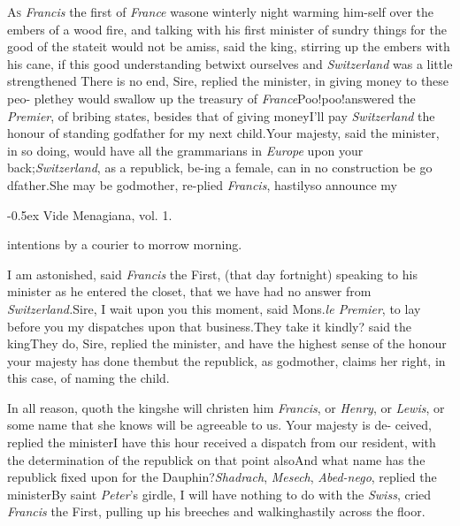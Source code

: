 \documentclass{article}
\begin{document}
\lettrine{A}{s} \textit{Francis} the first of
\textit{France} was\break one winterly night warming
him-\break self over the embers of a wood fire, and talking
with his first minister of sundry\pb 
things for the good of the state\tsk it\break
would not be amiss, said the king, stirring up the embers
with his cane, if this\break
good understanding betwixt ourselves\break
and \textit{Switzerland} was a little strengthened\break
\tsk There is no end, Sire, replied the mi\-nister, in giving
money to these peo-\break
ple\tsk they would swallow up the treasury
of \textit{France}\tsk Poo!\@ poo!\@  answered the \break
\textit{Premier}, of bribing
states, besides that\break
of giving money\tsh I’ll pay
\textit{Switzerland} the honour of standing godfather\break
for my next child.\tsk Your majesty, said the minister, in
so doing, would have all the grammarians in \textit{Europe}
upon your back;\tsk \textit{Switzerland}, as a republick,
be-\break ing a female, can in no construction be go
dfather.\tsk She
may be godmother, re-\break plied \textit{Francis}, hastily\tsk so
announce my\break\enlargethispage{\baselineskip}

\parskip
\bgroup\fontsize{8}{8}\selectfont
\indent\lower -0.5ex\hbox{\ast} Vide Menagiana, vol. 1.\par\egroup

\newpage
\noindent
intentions by a courier to morrow morning.

I am astonished, said \textit{Francis} the First, (that day
fortnight) speaking to his minister as he entered the closet, that
we have had no answer from \textit{Switzerland.}\tsh Sire, I
wait upon you this moment, said Mons.\@ \textit{le Premier}, to lay
before you my dispatches upon that business.\tsk They take it
kindly? said the king\tsk They do, Sire, replied the minister,
and have the highest sense of the honour your majesty has done
them\tsh but the republick, as godmother, claims her
right, in this case, of naming the child.

In all reason, quoth the king\tsk she will christen him
\textit{Francis}, or \textit{Henry}, or \textit{Lewis}, or some name that
she knows will be agreeable to us. Your majesty is de-\pb
ceived, replied the minister\tsk I have this hour received a
dispatch from our resident, with the determination of the
re\-publick on that point also\tsh And what name has the
republick fixed upon for the Dauphin?\tsh \textit{Shadrach},
\textit{Mesech}, \textit{Abed-nego}, replied the
minister\tsk By saint\break
\textit{Peter}’s girdle, I will have nothing to do with the
\textit{Swiss}, cried \textit{Francis} the First, pulling up
his breeches and walking\break hastily across the floor.
\end{document}

